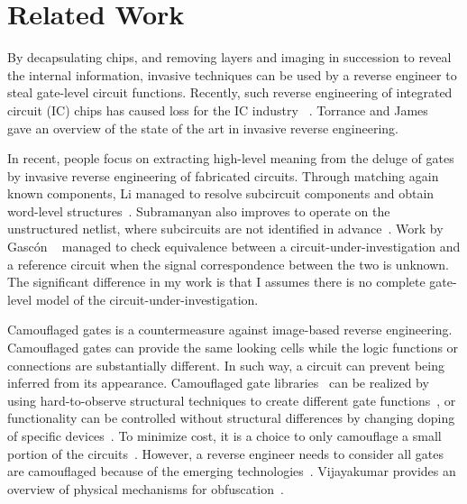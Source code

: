 \documentclass[thesis]{umassthesis}  %
\begin{document}








\chapter{Related Work}

By decapsulating chips, and removing layers and imaging in succession to reveal the internal information, invasive techniques can be used by a reverse engineer to steal gate-level circuit functions. Recently, such reverse engineering of integrated circuit (IC) chips has caused loss for the IC industry ~\cite{torrance-11}. Torrance and James ~\cite{torrance-11} gave an overview of the state of the art in invasive reverse engineering.

In recent, people focus on extracting high-level meaning from the deluge of gates by invasive reverse engineering of fabricated circuits. Through matching again known components, Li managed to resolve subcircuit components and obtain word-level structures~\cite{li-12}. Subramanyan also improves to operate on the unstructured netlist, where subcircuits are not identified in advance~\cite{subramanyan-13}. Work by Gasc{\'o}n ~\cite{gascon-14} managed to check equivalence between a circuit-under-investigation and a reference circuit when the signal correspondence between the two is unknown.  The significant difference in my work is that I assumes there is no complete gate-level model of the circuit-under-investigation.

Camouflaged gates is a countermeasure against image-based reverse engineering. Camouflaged gates can provide the same looking cells while the logic functions or connections are substantially different. In such way, a circuit can prevent being inferred from its appearance.   Camouflaged gate libraries~\cite{syphermedia-library} can be realized by using hard-to-observe structural techniques to create different gate functions~\cite{cocchi-14}, or functionality can be controlled without structural differences by changing doping of specific devices~\cite{becker-13,shiozaki-14,malik-obfusgate,iyengar-15}.  To minimize cost, it is a choice to only camouflage a small portion of the circuits~\cite{chakraborty-09,rajendran-13}. However, a reverse engineer needs to consider all gates are camouflaged because of the emerging technologies~\cite{bi2016emerging}. Vijayakumar provides an overview of physical mechanisms for obfuscation~\cite{vijayakumar-2017-physical}.
\end{document}
